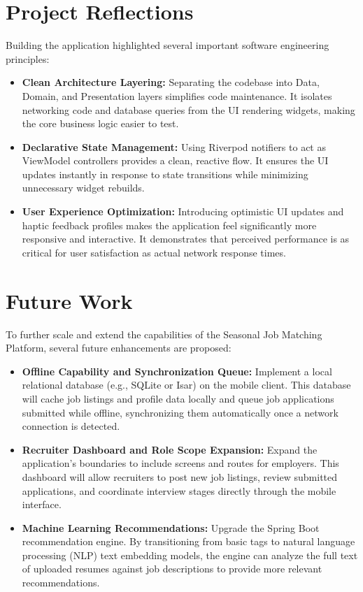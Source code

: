 \section{Project Reflections}
Building the application highlighted several important software engineering principles:
\begin{itemize}
    \item \textbf{Clean Architecture Layering:} Separating the codebase into Data, Domain, and Presentation layers simplifies code maintenance. It isolates networking code and database queries from the UI rendering widgets, making the core business logic easier to test.
    \item \textbf{Declarative State Management:} Using Riverpod notifiers to act as ViewModel controllers provides a clean, reactive flow. It ensures the UI updates instantly in response to state transitions while minimizing unnecessary widget rebuilds.
    \item \textbf{User Experience Optimization:} Introducing optimistic UI updates and haptic feedback profiles makes the application feel significantly more responsive and interactive. It demonstrates that perceived performance is as critical for user satisfaction as actual network response times.
\end{itemize}

\section{Future Work}
To further scale and extend the capabilities of the Seasonal Job Matching Platform, several future enhancements are proposed:
\begin{itemize}
    \item \textbf{Offline Capability and Synchronization Queue:} Implement a local relational database (e.g., SQLite or Isar) on the mobile client. This database will cache job listings and profile data locally and queue job applications submitted while offline, synchronizing them automatically once a network connection is detected.
    \item \textbf{Recruiter Dashboard and Role Scope Expansion:} Expand the application's boundaries to include screens and routes for employers. This dashboard will allow recruiters to post new job listings, review submitted applications, and coordinate interview stages directly through the mobile interface.
    \item \textbf{Machine Learning Recommendations:} Upgrade the Spring Boot recommendation engine. By transitioning from basic tags to natural language processing (NLP) text embedding models, the engine can analyze the full text of uploaded resumes against job descriptions to provide more relevant recommendations.
\end{itemize}
